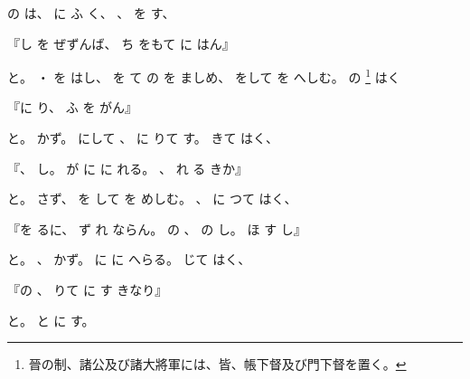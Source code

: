 \documentclass[a4paper,12pt]{article}
\begin{document}
の%
は、%
に%
ふ%
%
く、%
、%
を%
す、%
\begin{quoting}
『し%
を%
ぜずんば、%
ち%
をもて%
に%
はん』
\end{quoting}
と。%
・%
を%
はし、%
を%
て%
の%
を%
ましめ、%
%
%
をして%
を%
へしむ。%
の%
\footnote{晉の制、諸公及び諸大將軍には、皆、帳下督及び門下督を置く。}%
%
はく%
\begin{quoting}
『に%
%
り、%
ふ%
を%
がん』
\end{quoting}
と。%
%
かず。%
にして%
、%
に%
りて%
す。%
%
きて%
はく、%
\begin{quoting}
『、%
%
し。%
が%
に%
に%
れる。%
、%
れ%
る%
きか』
\end{quoting}
と。%
%
さず、%
を%
して%
を%
めしむ。%
%
、%
に%
つて%
はく、%
\begin{quoting}
『を%
るに、%
ず%
れ%
ならん。%
の%
、%
の%
し。%
ほ%
す%
し』
\end{quoting}
と。%
、%
かず。%
に%
に%
へらる。%
じて%
はく、%
\begin{quoting}
『の%
、%
りて%
に%
す%
きなり』
\end{quoting}
と。%
%
と%
に%
す。%
\end{document}
